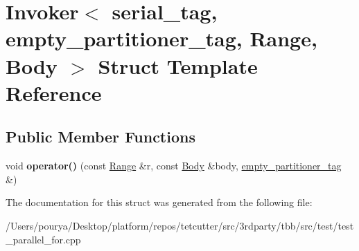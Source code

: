 \hypertarget{structInvoker_3_01serial__tag_00_01empty__partitioner__tag_00_01Range_00_01Body_01_4}{}\section{Invoker$<$ serial\+\_\+tag, empty\+\_\+partitioner\+\_\+tag, Range, Body $>$ Struct Template Reference}
\label{structInvoker_3_01serial__tag_00_01empty__partitioner__tag_00_01Range_00_01Body_01_4}
\subsection*{Public Member Functions}
\begin{DoxyCompactItemize}
\item 
\hypertarget{structInvoker_3_01serial__tag_00_01empty__partitioner__tag_00_01Range_00_01Body_01_4_ab0326290cc552c20ffe2e4a3e3e053b4}{}void {\bfseries operator()} (const \hyperlink{classtbb_1_1blocked__range}{Range} \&r, const \hyperlink{classBody}{Body} \&body, \hyperlink{structempty__partitioner__tag}{empty\+\_\+partitioner\+\_\+tag} \&)\label{structInvoker_3_01serial__tag_00_01empty__partitioner__tag_00_01Range_00_01Body_01_4_ab0326290cc552c20ffe2e4a3e3e053b4}

\end{DoxyCompactItemize}


The documentation for this struct was generated from the following file\+:\begin{DoxyCompactItemize}
\item 
/\+Users/pourya/\+Desktop/platform/repos/tetcutter/src/3rdparty/tbb/src/test/test\+\_\+parallel\+\_\+for.\+cpp\end{DoxyCompactItemize}
